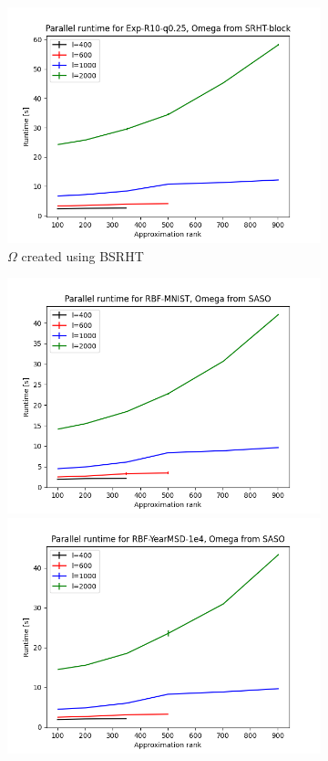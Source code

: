 \documentclass{article}
\theoremstyle{definition}
\begin{document}
\begin{figure}
\begin{subfigure}[t]{\textwidth+20pt\relax}
    \includegraphics[width=\dimexpr\linewidth-20pt\relax]{plots/runtime_new/runtime_par_Exp-R10-q0.25_SRHT-block.png}
    \caption{$\Omega$ created using BSRHT}
\end{subfigure}\hfill
\begin{subfigure}[t]{0.4\textwidth}
    \includegraphics[width=\textwidth]{plots/runtime_new/runtime_par_RBF-MNIST_SASO.png}
    \includegraphics[width=\textwidth]{plots/runtime_new/runtime_par_RBF-YearMSD-1e4_SASO.png}

\end{subfigure}
\end{figure}
\end{document}
